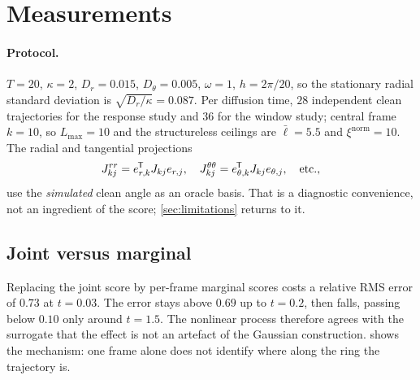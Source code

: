 \documentclass[11pt,a4paper]{article}
\newcommand{\T}{^{\mkern-1.5mu\mathsf{T}}}
\begin{document}
\section{Measurements}\label{sec:measurements}

\paragraph{Protocol.} $T=20$, $\kappa=2$, $D_r=0.015$, $D_\theta=0.005$, $\omega=1$,
$h=2\pi/20$, so the stationary radial standard deviation is $\sqrt{D_r/\kappa}=0.087$. Per
diffusion time, $28$ independent clean trajectories for the response study and $36$ for the
window study; central frame $k=10$, so $L_{\max}=10$ and the structureless ceilings are
$\bar\ell=5.5$ and $\xi^{\mathrm{norm}}=10$. The radial and tangential projections
\begin{equation}
 J^{rr}_{kj}=e_{r,k}\T J_{kj}e_{r,j},
 \quad
 J^{\theta\theta}_{kj}=e_{\theta,k}\T J_{kj}e_{\theta,j},
 \quad\text{etc.},
 \label{eq:projected-response}
\end{equation}
use the \emph{simulated} clean angle as an oracle basis. That is a diagnostic convenience, not
an ingredient of the score; \cref{sec:limitations} returns to it.

\begin{table}[H]
\centering
\caption{Original polar model: reach and weighted reach by channel, the cost of dropping
context, and the window radii. $\bar\ell$ is the weighted mean lag \eqref{eq:mean-lag},
$\widetilde\Xi$ the relative weighted reach \eqref{eq:weighted-reach}, $L^{5\%}$ the receptive
radius \eqref{eq:window-error}. The structureless ceiling for $\bar\ell$ is $5.5$.}
\label{tab:polar-response}

\end{table}

\subsection{Joint versus marginal}

Replacing the joint score by per-frame marginal scores costs a relative RMS error of $0.73$ at
$t=0.03$. The error stays above $0.69$ up to $t=0.2$, then falls, passing below $0.10$ only
around $t=1.5$. The nonlinear process therefore agrees with the surrogate that the effect is
not an artefact of the Gaussian construction.  shows the
mechanism: one frame alone does not identify where along the ring the trajectory is.
\end{document}
